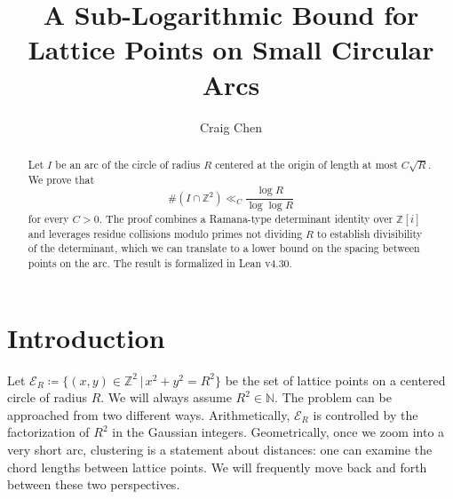 \documentclass[11pt]{article}
\title{A Sub-Logarithmic Bound for Lattice Points on Small Circular Arcs}
\author{Craig Chen}
\date{}
\newcommand{\Z}{\mathbb Z}
\newcommand{\E}{\mathcal E}
\begin{document}
\maketitle

\begin{abstract}
    Let $I$ be an arc of the circle of radius $R$ centered at the origin of length at most $C\sqrt{R}$. We prove that 
$$
\#(I \cap \Z^2) \ll_C \frac{\log R}{\log\log R}
$$
for every $C>0$.
The proof combines a Ramana-type determinant identity over \(\Z[i]\) and leverages residue collisions modulo primes not dividing $R$ to establish divisibility of the determinant, which we can translate to a lower bound on the spacing between points on the arc. 
The result is formalized in Lean v4.30.
\end{abstract}


\tableofcontents

\section{Introduction}
\label{sec:intro}

Let $\E_R \coloneq \{ (x,y) \in \mathbb{Z}^2 \, | \, x^2 + y^2 = R^2 \}$ be the set of lattice points on a centered circle of radius $R$.
We will always assume $R^2 \in \mathbb{N}$.
The problem can be approached from two different ways.
Arithmetically, \(\E_R\) is controlled by the factorization of \(R^2\) in the Gaussian integers.
Geometrically, once we zoom into a very short arc, clustering is a statement about distances: one can examine the chord lengths between lattice points.
We will frequently move back and forth between these two perspectives.
\end{document}
